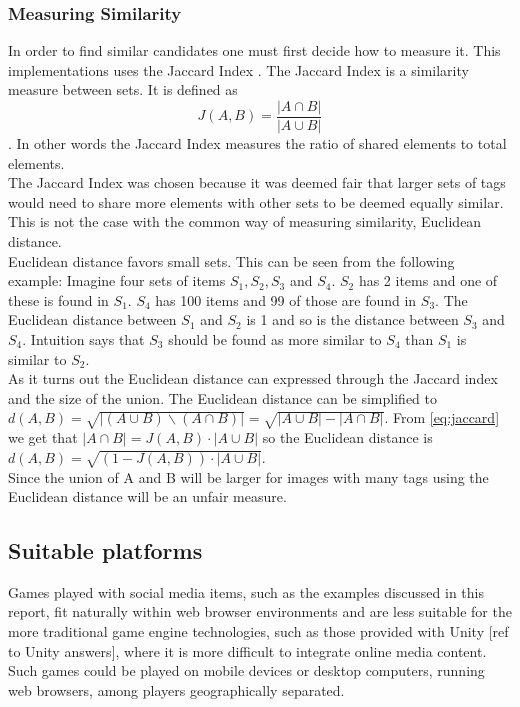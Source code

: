\documentclass[]{article}
\begin{document}
\subsubsection{Measuring Similarity}
In order to find similar candidates one must first decide how to measure it. This implementations uses the Jaccard Index \cite{jaccard1912distribution}. The Jaccard Index is a similarity measure between sets. It is defined as
\begin{equation}
\label{eq:jaccard}
J(A,B) = \frac{|A \cap B|}{|A \cup B|}
\end{equation}
. In other words the Jaccard Index measures the ratio of shared elements to total elements.\\
The Jaccard Index was chosen because it was deemed fair that larger sets of tags would need to share more elements with other sets to be deemed equally similar. This is not the case with the common way of measuring similarity, Euclidean distance.\\
Euclidean distance favors small sets. This can be seen from the following example: Imagine four sets of items $S_1, S_2, S_3$ and $S_4$. $S_2$ has 2 items and one of these is found in $S_1$. $S_4$ has 100 items and 99 of those are found in $S_3$. The Euclidean distance between $S_1$ and $S_2$ is 1 and so is the distance between $S_3$ and $S_4$. Intuition says that $S_3$ should be found as more similar to $S_4$ than $S_1$ is similar to $S_2$.\\
As it turns out the Euclidean distance can expressed through the Jaccard index and the size of the union. The Euclidean distance can be simplified to $d(A,B) = \sqrt{|(A \cup B) \backslash (A \cap B)|} = \sqrt{|A \cup B| - |A \cap B|}$. From \autoref{eq:jaccard} we get that $|A \cap B| = J(A,B) \cdot |A \cup B|$ so the Euclidean distance is $d(A,B) = \sqrt{(1 - J(A,B)) \cdot |A \cup B|}$.\\
Since the union of A and B will be larger for images with many tags using the Euclidean distance will be an unfair measure.


\subsection{Suitable platforms}

Games played with social media items, such as the examples discussed in this report, fit naturally within web browser environments and are less suitable for the more traditional game engine technologies, such as those provided with Unity [ref to Unity answers], where it is more difficult to integrate online media content.  Such games could be played on mobile devices or desktop computers, running web browsers, among players geographically separated.  
\end{document}
